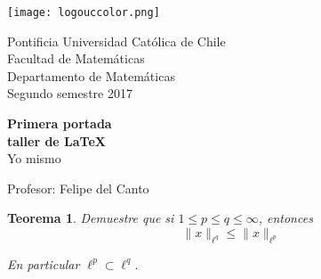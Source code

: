 \documentclass{article}
\newtheorem{teo}{Teorema}
\begin{document}
\begin{titlepage}

	\begin{minipage}{2.5cm}
		\texttt{[image: logouccolor.png]}
	\end{minipage}
	
	\begin{minipage}{13 cm}
	
		\begin{flushleft}
   			\noindent\large{\sc
				Pontificia Universidad Católica de Chile \\ 
		     		Facultad de Matemáticas \\ 
		     		Departamento de Matemáticas \\ 
				Segundo semestre 2017
		     	}
		\end{flushleft}
	\end{minipage}
	
\begin{center}
	\vspace*{\fill} %
		\Huge\textbf{Primera portada}	\\
		\Huge\textbf{taller de \LaTeX}	\\
		\LARGE{Yo mismo} \\
	\vspace*{\fill}
		
	\vfill %
		
	\Large{Profesor: Felipe del Canto}

\end{center}
\end{titlepage}

\begin{teo} Demuestre que si $1 \leq p \leq q \leq \infty$, entonces
	$$\|x\|_{\ell^{q}} \leq \|x\|_{\ell^{p}}$$
	
En particular $\ell^{p} \subset \ell^{q}$.
\end{teo}
\end{document}
